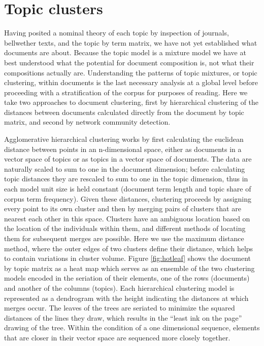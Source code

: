 \documentclass[]{book}
\theoremstyle{definition}
\theoremstyle{definition}
\theoremstyle{definition}
\theoremstyle{remark}
\begin{document}
\hypertarget{topic-clusters}{%
\section{Topic clusters}\label{topic-clusters}}

Having posited a nominal theory of each topic by inspection of journals,
bellwether texts, and the topic by term matrix, we have not yet
established what documents are about. Because the topic model is a
mixture model we have at best understood what the potential for document
composition is, not what their compositions actually are. Understanding
the patterns of topic mixtures, or topic clustering, within documents is
the last necessary analysis at a global level before proceeding with a
stratification of the corpus for purposes of reading. Here we take two
approaches to document clustering, first by hierarchical clustering of
the distances between documents calculated directly from the document by
topic matrix, and second by network community detection.

Agglomerative hierarchical clustering works by first calculating the
euclidean distance between points in an n-dimensional space, either as
documents in a vector space of topics or as topics in a vector space of
documents. The data are naturally scaled to sum to one in the document
dimension; before calculating topic distances they are rescaled to sum
to one in the topic dimension, thus in each model unit size is held
constant (document term length and topic share of corpus term
frequency). Given these distances, clustering proceeds by assigning
every point to its own cluster and then by merging pairs of clusters
that are nearest each other in this space. Clusters have an ambiguous
location based on the location of the individuals within them, and
different methods of locating them for subsequent merges are possible.
Here we use the maximum distance method, where the outer edges of two
clusters define their distance, which helps to contain variations in
cluster volume. Figure \ref{fig:hotleaf} shows the document by topic
matrix as a heat map which serves as an ensemble of the two clustering
models encoded in the seriation of their elements, one of the rows
(documents) and another of the columns (topics). Each hierarchical
clustering model is represented as a dendrogram with the height
indicating the distances at which merges occur. The leaves of the trees
are seriated to minimize the squared distances of the lines they draw,
which results in the ``least ink on the page'' drawing of the tree.
Within the condition of a one dimensional sequence, elements that are
closer in their vector space are sequenced more closely together.
\end{document}
